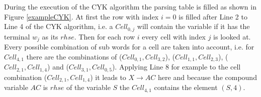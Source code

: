 \noindent {}
During the execution of the CYK algorithm the parsing table is filled as shown in Figure \ref{exampleCYK}. At first the row with index $i=0$ is filled after Line 2 to Line 4 of the CYK algorithm, i.e. a $Cell_{0,j}$ will contain the variable if it has the terminal $w_j$ as its $rhse$. Then for each row $i$ every cell with index $j$ is looked at. Every possible combination of sub words for a cell are taken into account, i.e. for $Cell_{4,1}$ there are the combinations of ($Cell_{0,1},Cell_{3,2}$), ($Cell_{1,1},Cell_{2,3}$), ($Cell_{2,1},Cell_{1,4}$) and ($Cell_{3,1},Cell_{0,5}$). Applying Line 8 for example to the cell combination ($Cell_{2,1},Cell_{1,4}$) it leads to $X\rightarrow AC$ here and because the compound variable $AC$ is $rhse$ of the variable $S$ the $Cell_{4,1}$ contains the element $(S,4)$.
\noindent
